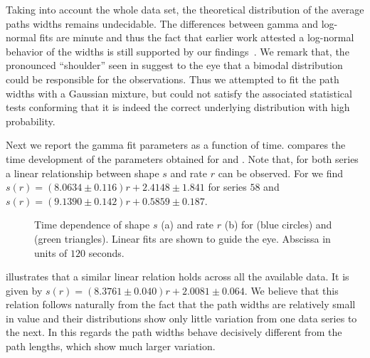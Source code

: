		Taking into account the whole data set, the theoretical distribution of the average paths widths remains undecidable. The differences between gamma and log-normal fits are minute and thus the fact that earlier work attested a log-normal behavior of the widths is still supported by our findings~\cite{baumgarten2010plasmodial}. We remark that, the pronounced ``shoulder'' seen in  suggest to the eye that a bimodal distribution could be responsible for the observations. Thus we attempted to fit the path widths with a Gaussian mixture, but could not satisfy the associated statistical tests conforming that it is indeed the correct underlying distribution with high probability.

		Next we report the gamma fit parameters as a function of time.  compares the time development of the parameters obtained for  and . Note that, for both series a linear relationship between shape $s$ and rate $r$ can be observed. For  we find $s(r) = (8.0634 \pm 0.116) r + 2.4148 \pm 1.841$ for series $58$ and $s(r) = (9.1390 \pm 0.142) r + 0.5859 \pm 0.187$.
		
		\begin{figure}
			\centering
			\qquad

			\caption[Path width distribution fit parameters.]{Time dependence of shape $s$ (a) and rate $r$ (b) for  (blue circles) and  (green triangles). Linear fits are shown to guide the eye. Abscissa in units of $120$ seconds.}
			\label{fig:path_width_fit_parameters}
		\end{figure}


		 illustrates that a similar linear relation holds across all the available data. It is given by $s(r) = (8.3761 \pm 0.040) r + 2.0081 \pm 0.064$. We believe that this relation follows naturally from the fact that the path widths are relatively small in value and their distributions show only little variation from one data series to the next. In this regards the path widths behave decisively different from the path lengths, which show much larger variation.

